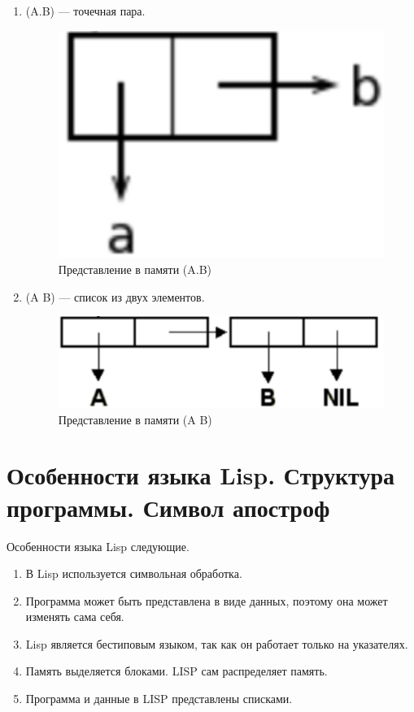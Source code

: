 \documentclass[a4paper,14pt, unknownkeysallowed]{extreport}
\begin{document}
\begin{enumerate}
	\item (A.B) — точечная пара.
	
	\begin{figure}[h]
		\centering
		\includegraphics[scale=0.45]{img/picture1.png}
		\caption{Представление в памяти (A.B)}
		\label{fig:picture1}
	\end{figure} 

	\item (A B) — список из двух элементов.
	
	\begin{figure}[h]
		\centering
		\includegraphics[scale=0.5]{img/picture2.png}
		\caption{Представление в памяти (A B)}
		\label{fig:picture2}
	\end{figure} 
\end{enumerate}


\section{Особенности языка Lisp. Структура программы. Символ апостроф}

Особенности языка Lisp следующие.

\begin{enumerate}
	\item В Lisp используется символьная обработка.
	\item Программа может быть представлена в виде данных, поэтому она может изменять сама себя.
	\item Lisp является бестиповым языком, так как он работает только на указателях.
	\item Память выделяется блоками. LISP сам распределяет память.
	\item Программа и данные в LISP представлены списками.
\end{enumerate}
\end{document}
